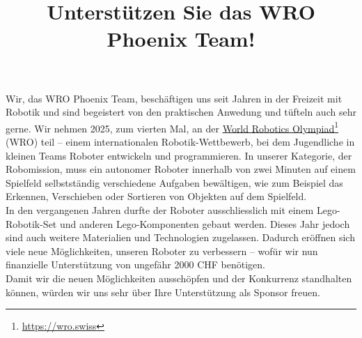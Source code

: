 \documentclass[11pt]{article}
\title {\vspace{-1cm} \huge \textbf {Unterstützen Sie das WRO Phoenix Team!}}
\author{}
\date{}
\begin{document}
    \vspace{-1cm}
    \maketitle
    \vspace{-1cm}



    \noindent Wir, das WRO Phoenix Team, beschäftigen uns seit Jahren in der Freizeit mit Robotik und sind begeistert von den praktischen Anwedung und tüfteln auch sehr gerne.
    Wir nehmen 2025, zum vierten Mal, an der \href{https://wro.swiss/}{World Robotics Olympiad}\footnote{\href{https://wro.swiss}{https://wro.swiss}} (WRO) teil – einem internationalen Robotik-Wettbewerb, bei dem Jugendliche in kleinen Teams Roboter entwickeln und programmieren. In unserer Kategorie, der Robomission, muss ein autonomer Roboter innerhalb von zwei Minuten auf einem Spielfeld selbstständig verschiedene Aufgaben bewältigen, wie zum Beispiel das Erkennen, Verschieben oder Sortieren von Objekten auf dem Spielfeld.
    \vspace{0.2cm}
    \\
    In den vergangenen Jahren durfte der Roboter ausschliesslich mit einem Lego-Robotik-Set und anderen Lego-Komponenten gebaut werden. Dieses Jahr jedoch sind auch weitere Materialien und Technologien zugelassen. Dadurch eröffnen sich viele neue Möglichkeiten, unseren Roboter zu verbessern – wofür wir nun finanzielle Unterstützung von ungefähr 2000 CHF benötigen.
    \vspace{0.2cm}
    \\
    Damit wir die neuen Möglichkeiten ausschöpfen und der Konkurrenz standhalten können, würden wir uns sehr über Ihre Unterstützung als Sponsor freuen.
\end{document}
